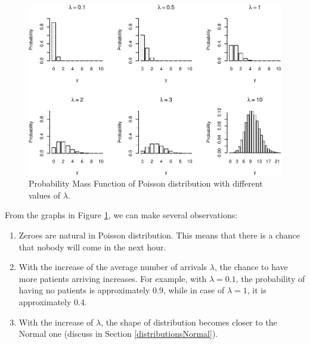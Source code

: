 \documentclass[
]{book}
\providecommand{\tightlist}{%
  \setlength{\itemsep}{0pt}\setlength{\parskip}{0pt}}
\theoremstyle{definition}
\theoremstyle{definition}
\theoremstyle{definition}
\theoremstyle{definition}
\theoremstyle{remark}
\begin{document}
\begin{figure}
\centering
\includegraphics{Svetunkov---Statistics-for-Business-Analytics_files/figure-latex/poissonPMF-1.pdf}
\caption{\label{fig:poissonPMF}Probability Mass Function of Poisson distribution with different values of \(\lambda\).}
\end{figure}

From the graphs in Figure \ref{fig:poissonPMF}, we can make several observations:

\begin{enumerate}
\def\labelenumi{\arabic{enumi}.}
\tightlist
\item
  Zeroes are natural in Poisson distribution. This means that there is a chance that nobody will come in the next hour.
\item
  With the increase of the average number of arrivals \(\lambda\), the chance to have more patients arriving increases. For example, with \(\lambda=0.1\), the probability of having no patients is approximately 0.9, while in case of \(\lambda=1\), it is approximately 0.4.
\item
  With the increase of \(\lambda\), the shape of distribution becomes closer to the Normal one (discuss in Section \ref{distributionsNormal}).
\end{enumerate}
\end{document}

